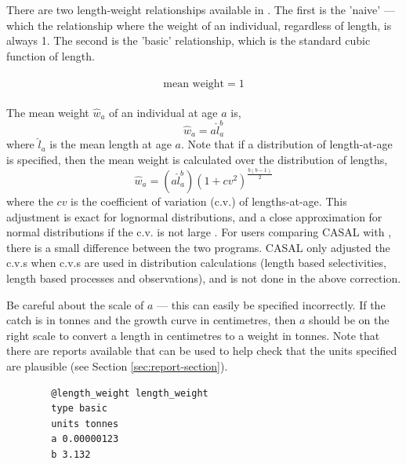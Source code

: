 There are two length-weight relationships available in \CNAME. The first is the 'naive' --- which the relationship where the weight of an individual, regardless of length, is always 1. The second is the 'basic' relationship, which is the standard cubic function of length. 

\paragraph[None]{}

  \begin{equation}
    \text{mean weight}=1
  \end{equation}

\paragraph[Basic]{}

The mean weight $\hat{w}_a$ of an individual at age $a$ is,
  \begin{equation}
    \hat{w}_a=a \hat{l}_a^b
  \end{equation}
	where $\hat{l}_a$ is the mean length at age $a$. Note that if a distribution of length-at-age is specified, then the mean weight is calculated over the distribution of lengths,
  \begin{equation}
	  \hat{w}_a=(a\hat{l}_a^b)(1+cv^2)^{\frac{b(b-1)}{2}}
  \end{equation}
	where the $cv$ is the coefficient of variation (c.v.) of lengths-at-age. This adjustment is exact for lognormal distributions, and a close approximation for normal distributions if the c.v. is not large \citep{1388}. For users comparing CASAL with \CNAME, there is a small difference between the two programs. CASAL only adjusted the c.v.s  when c.v.s are used in distribution calculations (length based selectivities, length based processes and observations), and is not done in the above correction.


Be careful about the scale of $a$ --- this can easily be specified incorrectly. If the catch is in tonnes and the growth curve in centimetres, then $a$ should be on the right scale to convert a length in centimetres to a weight in tonnes. Note that there are reports available that can be used to help check that the units specified are plausible (see Section \ref{sec:report-section}).

{\small{\begin{verbatim}
		@length_weight length_weight
		type basic
		units tonnes
		a 0.00000123
		b 3.132
\end{verbatim}}}


